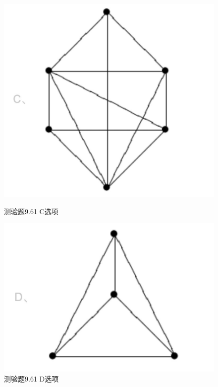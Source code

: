 \documentclass[UTF8, heading=true]{ctexart}
\begin{document}
\begin{figure}[H]
    \centering
    \begin{minipage}[t]{0.35\textwidth}
        \centering
        \includegraphics[width=1\textwidth]{9.61_3.jpg} %
	      \vspace{-0.3cm}
        \caption{测验题9.61 C选项}
    \end{minipage}
	  \hspace{0.1\textwidth} %
    \begin{minipage}[t]{0.35\textwidth}
        \centering
        \includegraphics[width=1\textwidth]{9.61_4.jpg} %
	      \vspace{-0.3cm}
        \caption{测验题9.61 D选项}
\end{minipage}
\end{figure}
\end{document}
